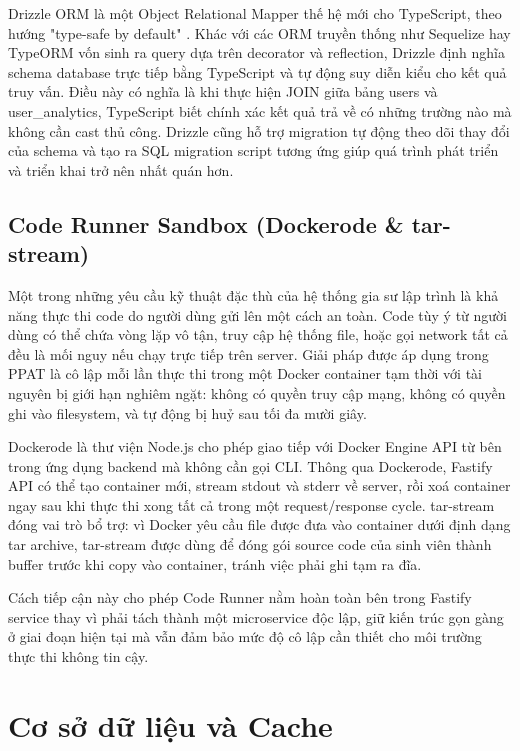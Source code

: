 \documentclass[../main.tex]{subfiles}
\begin{document}
Drizzle ORM là một Object Relational Mapper thế hệ mới cho TypeScript, theo hướng "type-safe by default" \cite{drizzle2024orm}. Khác với các ORM truyền thống như Sequelize hay TypeORM vốn sinh ra query dựa trên decorator và reflection, Drizzle định nghĩa schema database trực tiếp bằng TypeScript và tự động suy diễn kiểu cho kết quả truy vấn. Điều này có nghĩa là khi thực hiện JOIN giữa bảng users và user\_analytics, TypeScript biết chính xác kết quả trả về có những trường nào mà không cần cast thủ công. Drizzle cũng hỗ trợ migration tự động theo dõi thay đổi của schema và tạo ra SQL migration script tương ứng giúp quá trình phát triển và triển khai trở nên nhất quán hơn.

\subsection{Code Runner Sandbox (Dockerode \& tar-stream)}

Một trong những yêu cầu kỹ thuật đặc thù của hệ thống gia sư lập trình là khả năng thực thi code do người dùng gửi lên một cách an toàn. Code tùy ý từ người dùng có thể chứa vòng lặp vô tận, truy cập hệ thống file, hoặc gọi network tất cả đều là mối nguy nếu chạy trực tiếp trên server. Giải pháp được áp dụng trong PPAT là cô lập mỗi lần thực thi trong một Docker container tạm thời với tài nguyên bị giới hạn nghiêm ngặt: không có quyền truy cập mạng, không có quyền ghi vào filesystem, và tự động bị huỷ sau tối đa mười giây.

Dockerode là thư viện Node.js cho phép giao tiếp với Docker Engine API từ bên trong ứng dụng backend mà không cần gọi CLI. Thông qua Dockerode, Fastify API có thể tạo container mới, stream stdout và stderr về server, rồi xoá container ngay sau khi thực thi xong tất cả trong một request/response cycle. tar-stream đóng vai trò bổ trợ: vì Docker yêu cầu file được đưa vào container dưới định dạng tar archive, tar-stream được dùng để đóng gói source code của sinh viên thành buffer trước khi copy vào container, tránh việc phải ghi tạm ra đĩa.

Cách tiếp cận này cho phép Code Runner nằm hoàn toàn bên trong Fastify service thay vì phải tách thành một microservice độc lập, giữ kiến trúc gọn gàng ở giai đoạn hiện tại mà vẫn đảm bảo mức độ cô lập cần thiết cho môi trường thực thi không tin cậy.

\section{Cơ sở dữ liệu và Cache}
\end{document}
